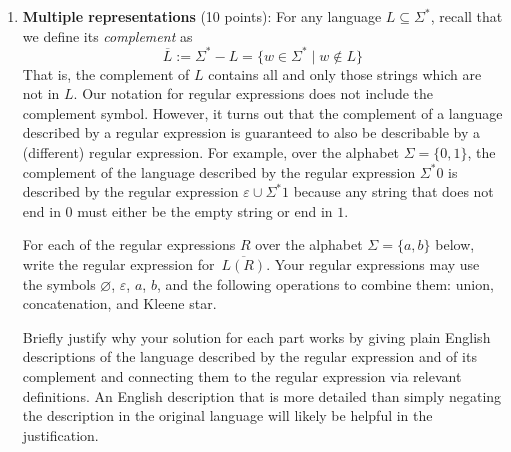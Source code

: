 \documentclass[12pt, oneside]{article}
\newcommand{\gradeCorrect}{({\it Graded for correctness}) }
\begin{document}
\begin{enumerate}[wide, labelwidth=!, labelindent=0pt]
\begin{enumerate}
    {\it Hints}: (1) Consider having a state for each possible remainder upon division by $m$.
     (2) To determine transitions, notice that reading a new character will shift what we already read over by
     one slot.

    \item\gradeCorrect Choose a positive integer $m_{0}$ between $4$ and $8$ (inclusive) and draw the state diagram
    of a DFA recognizing the language over $\{0,1,2\}$ $$\{ w \in \{0,1,2\}^* \mid w \text{ is a base $3$ expansion of a positive 
    integer that is a multiple of $m_0$}\}$$
    A complete solution will include the state diagram of your DFA and 
    a brief justification 
    of your construction by explaining the role each state plays in the machine, as well as a brief 
    justification about how the strings accepted and rejected by the machine connect to the specified language.
    \end{enumerate}

    {\it Bonus extension to think about (ungraded):} Which other languages related to sets of integers 
    can be proved to be regular using a similar strategy? 


\item\textbf{Multiple representations} (10 points):
For any language $L \subseteq \Sigma^*$, recall that we define its \emph{complement} as 
$$\overline{L} := \Sigma^* - L = \{w \in \Sigma^* \mid w \notin L\}$$ That is, the complement of $L$ 
contains all and only those strings which are not in $L$. Our notation for regular expressions does not 
include the complement symbol. However, 
it turns out that the complement of a language described by a regular expression is guaranteed to also be describable by a 
(different) regular expression. For example, over the alphabet $\Sigma = \{0,1\}$, the complement of the language described 
by the regular expression $\Sigma^* 0$ is described by the regular expression $\varepsilon \cup \Sigma^*1$
because any string that does not end in $0$
must either be the empty string or end in $1$.

For each of the regular expressions $R$ over the alphabet $\Sigma = \{a,b\}$ below, write the regular 
expression for~$\overline{L(R)}$. Your regular expressions may use the symbols
$\varnothing$, $\varepsilon$, $a$, $b$, and the 
following operations to combine them: union, concatenation, 
and Kleene star.

Briefly justify why your solution for each part works by giving plain English descriptions of the language 
described by the regular expression and of its complement and connecting them to the regular 
expression via relevant definitions. An English description that is more 
detailed than simply negating the description in the original language will likely be helpful in the justification.


\end{enumerate}
\end{document}
